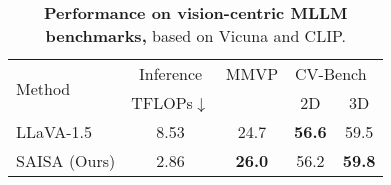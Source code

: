 \begin{table}[t]
  \centering
    \scalebox{0.9}
    {
    \begin{tabular}{l|c|ccc}
    \toprule
    \multirow{2}[2]{*}{Method} & Inference &  MMVP  & \multicolumn{2}{c}{CV-Bench~\cite{tong2024cambrian1fullyopenvisioncentric}}     \\
         & TFLOPs$\downarrow$      &   \cite{tong2024eyeswideshutexploring}          & 2D & 3D  \\
    \midrule
    LLaVA-1.5 & 8.53 & 24.7    & \textbf{56.6}  & 59.5   \\
    \rowcolor{cyan!20} SAISA (Ours) & 2.86 & \textbf{26.0}  & 56.2  & \textbf{59.8}   \\
    \bottomrule
    \end{tabular}
    }
    \caption{\textbf{Performance on vision-centric MLLM benchmarks,} based on Vicuna and CLIP.}
  \label{tab:vision-centric}
\end{table}
